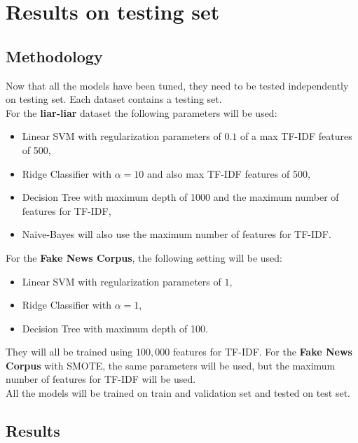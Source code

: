 \section{Results on testing set}
\subsection{Methodology}
Now that all the models have been tuned, they need to be tested independently on testing set. Each dataset contains a testing set. \\
For the \textbf{liar-liar} dataset the following parameters will be used:
\begin{itemize}
 \item Linear SVM with regularization parameters of $0.1$ of a max TF-IDF features of 500,
 \item Ridge Classifier with $\alpha = 10$ and also max TF-IDF features of 500,
 \item Decision Tree with maximum depth of 1000 and the maximum number of features for TF-IDF,
 \item Na\"{i}ve-Bayes will also use the maximum number of features for TF-IDF.
\end{itemize}
For the \textbf{Fake News Corpus}, the following setting will be used:
\begin{itemize}
 \item Linear SVM with regularization parameters of $1$,
 \item Ridge Classifier with $\alpha = 1$,
 \item Decision Tree with maximum depth of 100.
\end{itemize}
They will all be trained using $100,000$ features for TF-IDF.
For the \textbf{Fake News Corpus} with SMOTE, the same parameters will be used, but the maximum number of features for TF-IDF will be used.\\
All the models will be trained on train and validation set and tested on test set. 
\subsection{Results}
